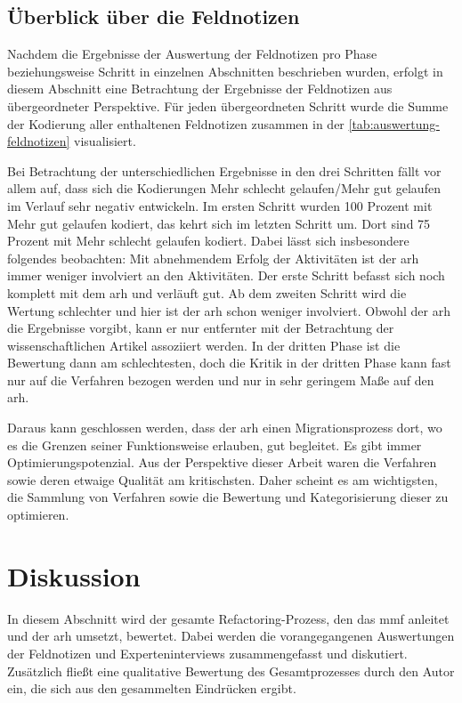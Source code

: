 \subsection{Überblick über die Feldnotizen}

Nachdem die Ergebnisse der Auswertung der Feldnotizen pro Phase beziehungsweise Schritt in einzelnen Abschnitten beschrieben wurden, erfolgt in diesem Abschnitt eine Betrachtung der Ergebnisse der Feldnotizen aus übergeordneter Perspektive.
Für jeden übergeordneten Schritt wurde die Summe der Kodierung aller enthaltenen Feldnotizen zusammen in der \cref{tab:auswertung-feldnotizen} visualisiert.


Bei Betrachtung der unterschiedlichen Ergebnisse in den drei Schritten fällt vor allem auf, dass sich die Kodierungen \glqq Mehr schlecht gelaufen\grqq{}/\glqq Mehr gut gelaufen\grqq{} im Verlauf sehr negativ entwickeln.
Im ersten Schritt wurden 100 Prozent mit \glqq Mehr gut gelaufen\grqq{} kodiert, das kehrt sich im letzten Schritt um.
Dort sind 75 Prozent mit \glqq Mehr schlecht gelaufen\grqq{} kodiert.
Dabei lässt sich insbesondere folgendes beobachten: Mit abnehmendem Erfolg der Aktivitäten ist der \gls{arh} immer weniger involviert an den Aktivitäten.
Der erste Schritt befasst sich noch komplett mit dem \gls{arh} und verläuft gut.
Ab dem zweiten Schritt wird die Wertung schlechter und hier ist der \gls{arh} schon weniger involviert.
Obwohl der \gls{arh} die Ergebnisse vorgibt, kann er nur entfernter mit der Betrachtung der wissenschaftlichen Artikel assoziiert werden.
In der dritten Phase ist die Bewertung dann am schlechtesten, doch die Kritik in der dritten Phase kann fast nur auf die Verfahren bezogen werden und nur in sehr geringem Maße auf den \gls{arh}.

Daraus kann geschlossen werden, dass der \gls{arh} einen Migrationsprozess dort, wo es die Grenzen seiner Funktionsweise erlauben, gut begleitet.
Es gibt immer Optimierungspotenzial.
Aus der Perspektive dieser Arbeit waren die Verfahren sowie deren etwaige Qualität am kritischsten.
Daher scheint es am wichtigsten, die Sammlung von Verfahren sowie die Bewertung und Kategorisierung dieser zu optimieren.

\section{Diskussion}
\label{sec:auswertung-diskussion}

In diesem Abschnitt wird der gesamte Refactoring-Prozess, den das \gls{mmf} anleitet und der \gls{arh} umsetzt, bewertet.
Dabei werden die vorangegangenen Auswertungen der Feldnotizen und Experteninterviews zusammengefasst und diskutiert.
Zusätzlich fließt eine qualitative Bewertung des Gesamtprozesses durch den Autor ein, die sich aus den gesammelten Eindrücken ergibt.

